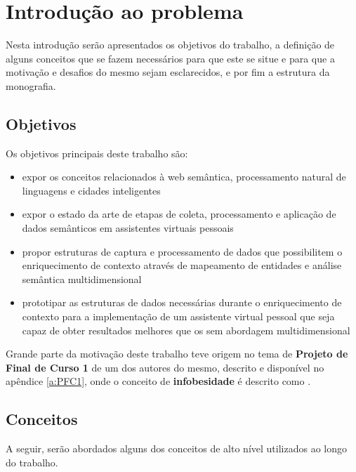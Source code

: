 \chapter{Introdução ao problema} \label{c:introducao_ao_problema}

Nesta introdução serão apresentados os objetivos do trabalho, a definição de alguns conceitos que se fazem necessários para que este se situe e para que a motivação e desafios do mesmo sejam esclarecidos, e por fim a estrutura da monografia.

\section{Objetivos} \label{s:objetivos}

Os objetivos principais deste trabalho são:

\begin{itemize}
    \item expor os conceitos relacionados à web semântica, processamento natural de linguagens e cidades inteligentes
    \item expor o estado da arte de etapas de coleta, processamento e aplicação de dados semânticos em assistentes virtuais pessoais
    \item propor estruturas de captura e processamento de dados que possibilitem o enriquecimento de contexto através de mapeamento de entidades e análise semântica multidimensional
    \item prototipar as estruturas de dados necessárias durante o enriquecimento de contexto para a implementação de um assistente virtual pessoal que seja capaz de obter resultados melhores que os sem abordagem multidimensional
\end{itemize}

Grande parte da motivação deste trabalho teve origem no tema de \textbf{Projeto de Final de Curso 1} de um dos autores do mesmo, descrito e disponível no apêndice \ref{a:PFC1}, onde o conceito de \textbf{infobesidade} é descrito como .

\section{Conceitos} \label{s:conceitos}

A seguir, serão abordados alguns dos conceitos de alto nível utilizados ao longo do trabalho.

